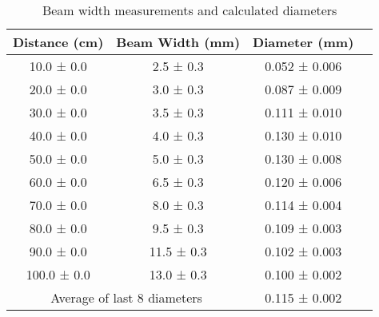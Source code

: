 
\begin{table}[h]
\centering
\begin{tabular}{|c|c|c|c|}
\hline
Distance (cm) & Beam Width (mm) & Diameter (mm) \\
\hline
10.0 ± 0.0 & 2.5 ± 0.3 & 0.052 ± 0.006 \\
20.0 ± 0.0 & 3.0 ± 0.3 & 0.087 ± 0.009 \\
30.0 ± 0.0 & 3.5 ± 0.3 & 0.111 ± 0.010 \\
40.0 ± 0.0 & 4.0 ± 0.3 & 0.130 ± 0.010 \\
50.0 ± 0.0 & 5.0 ± 0.3 & 0.130 ± 0.008 \\
60.0 ± 0.0 & 6.5 ± 0.3 & 0.120 ± 0.006 \\
70.0 ± 0.0 & 8.0 ± 0.3 & 0.114 ± 0.004 \\
80.0 ± 0.0 & 9.5 ± 0.3 & 0.109 ± 0.003 \\
90.0 ± 0.0 & 11.5 ± 0.3 & 0.102 ± 0.003 \\
100.0 ± 0.0 & 13.0 ± 0.3 & 0.100 ± 0.002 \\
\hline
\multicolumn{2}{|c|}{Average of last 8 diameters} & 0.115 ± 0.002 \\
\hline
\end{tabular}
\caption{Beam width measurements and calculated diameters}
\label{tab:beam_measurements}
\end{table}
